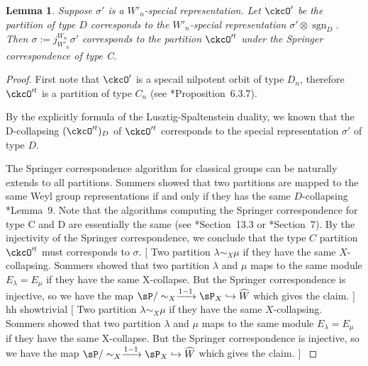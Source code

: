 \documentclass[12pt,a4paper]{amsart}
\newcommand{\trivial}[2][]{\if\relax\detokenize{#1}\relax
  {%
      \color{orange} \vspace{0em} $[$  #2 $]$
      \color{black}
  }
  \else
\ifx#1h
\ifcsname showtrivial\endcsname
{%
    \color{orange} \vspace{0em}  $[$ #2 $]$
    \color{black}
}
\fi
\else {\red Wrong argument!} \fi
\fi
}
\newcommand{\sgn}{\operatorname{sgn}}
\numberwithin{equation}{section}
\newtheorem{lem}[thm]{Lemma}
\theoremstyle{remark}
\begin{document}
\begin{lem}\label{lem:MD1}
  Suppose $\sigma'$ is a $W'_n$-special representation.%
  Let $\ckcO'$ be the partition of type $D$ corresponds to the $W'_n$-special representation
  $\sigma'\otimes \sgn_D$. Then $\sigma:=j_{W'_n}^{W_n} \sigma'$ corresponds to the partition $\ckcO'^t$ under the Springer correspondence of
  type C.
\end{lem}
\begin{proof}
  First note that $\ckcO'$ is a specail nilpotent orbit of type $D_n$,
  therefore $\ckcO'^t$ is a partition of type $C_n$ (see \cite{CM}*{Proposition~6.3.7}).

  By the explicitly formula of the Lusztig-Spaltenstein duality, we known that the D-collapsing
  $(\ckcO'^t)_D$ of $\ckcO'^t$ corresponds to the special representation
  $\sigma'$ of type $D$.

  The Springer correspondence algorithm for classical groups can be naturally extends to all partitions.
  Sommers showed that two partitions are mapped to the same Weyl group representations
  if and only if they has the same $D$-collapsing \cite{So}*{Lemma~9}.
  Note that the algorithms computing the Springer correspondence for type C and D are essentially the same
  (see \cite{Carter}*{Section~13.3} or \cite{So}*{Section~7}).
  By the injectivity of the Springer correspondence, we conclude that the type $C$ partition $\ckcO'^t$
  must corresponds to $\sigma$.
  \trivial[h]{
    Two partition $\lambda\sim_X \mu$ if they have the same $X$-collapsing.
  Sommers showed that two partition $\lambda$ and $\mu$ maps to the same module $E_\lambda = E_\mu$
  if they have the same X-collapse. But the Springer correspondence is injective,
  so we have the map $\sP/\sim_X \xrightarrow{1-1} \sP_X \hookrightarrow \widehat{W}$
  which gives the claim.
  }
\end{proof}
\end{document}
